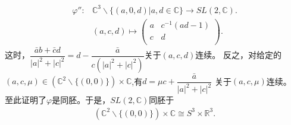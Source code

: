 \begin{enumerate}
    \begin{align*}
        \varphi '':&\mathbb{C}^3\backslash\{(a,0,d)|a,d\in\mathbb{C}\}\rightarrow SL(2,\mathbb{C}).\\
        &(a,c,d)\mapsto\begin{pmatrix}
            a & c^{-1}(ad-1)\\
            c & d\\
        \end{pmatrix}.
    \end{align*}
    这时，$\dfrac{\bar{a}b+\bar{c}d}{|a|^2+|c|^2}=d-\dfrac{\bar{a}}{c(|a|^2+|c|^2)}$关于$(a,c,d)$连续。
    反之，对给定的$(a,c,\mu)\in (\mathbb{C}^2\backslash\{(0,0)\})\times \mathbb{C}$,有$d=\mu c+\dfrac{\bar{a}}{|a|^2+|c|^2}$
    关于$(a,c,\mu)$连续。\\
    \quad 至此证明了$\varphi$是同胚。于是，$SL(2,\mathbb{C})$同胚于
    \begin{align*}
       (\mathbb{C}^2\backslash\{(0,0)\})\times \mathbb{C}\cong S^3\times \mathbb{R}^3.
    \end{align*}
\end{enumerate}


